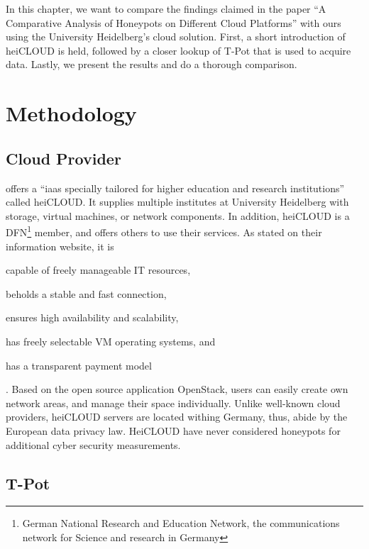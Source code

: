 In this chapter, we want to compare the findings \citet{Kelly2021} claimed in the paper \enquote{A Comparative Analysis of Honeypots on Different
    Cloud Platforms} with ours using the University Heidelberg's cloud solution.
First, a short introduction of heiCLOUD is held, followed by a closer lookup of T-Pot that is used to acquire data.
Lastly, we present the results and do a thorough comparison.

\section{Methodology}

\subsection{Cloud Provider}

\citet{urz2021} offers a \enquote{\ac{iaas} specially tailored for higher education and research institutions} called heiCLOUD.
It supplies multiple institutes at University Heidelberg with storage, virtual machines, or network components.
In addition, heiCLOUD is a DFN\footnote{German National Research and Education Network,  the communications network for Science and research in Germany} member, and offers others to use their services.
As stated on their information website\cite{heicloud2021}, it is
\begin{enumerate*}[label=(\roman*)]
    \item capable of freely manageable IT resources,
    \item beholds a stable and fast connection,
    \item ensures high availability and scalability,
    \item has freely selectable VM operating systems, and
    \item has a transparent payment model
\end{enumerate*} \cite{heicloud2021}.
Based on the open source application OpenStack, users can easily create own network areas, and manage their space individually.
Unlike well-known cloud providers, heiCLOUD servers are located withing Germany, thus, abide by the European data privacy law.
HeiCLOUD have never considered honeypots for additional cyber security measurements.

\subsection{T-Pot}
\label{sec:tpot}

